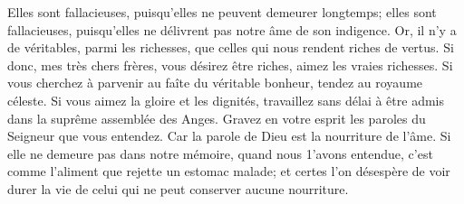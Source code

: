 Elles sont fallacieuses, puisqu’elles ne peuvent demeurer longtemps;
	elles sont fallacieuses,
		puisqu’elles ne délivrent pas notre âme de son indigence.
Or, il n’y a de véritables, parmi les richesses,
	que celles qui nous rendent riches de vertus.
Si donc, mes très chers frères, vous désirez être riches,
	aimez les vraies richesses.
	Si vous cherchez à parvenir au faîte du véritable bonheur,
	tendez au royaume céleste.
Si vous aimez la gloire et les dignités,
	travaillez sans délai à être admis dans la suprême assemblée des Anges.
Gravez en votre esprit les paroles du Seigneur que vous entendez.
	Car la parole de Dieu est la nourriture de l’âme.
Si elle ne demeure pas dans notre mémoire, quand nous 1’avons entendue,
	c’est comme l’aliment que rejette un estomac malade;
	et certes l’on désespère de voir durer la vie
	de celui qui ne peut conserver aucune nourriture.
